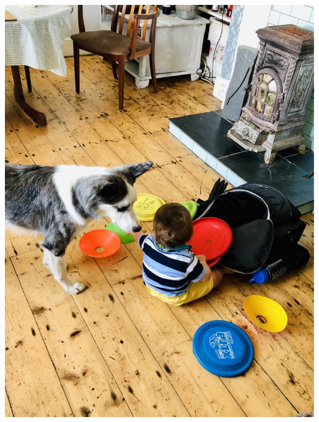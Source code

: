 \documentclass{beamer}
\begin{document}
    \begin{frame}
        \centering
        \includegraphics[height=.95\textheight]{static/riggs_looking_at_frisbees.jpg}
    \end{frame}
\end{document}
